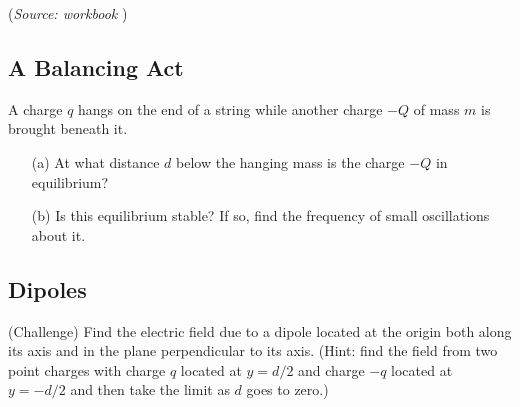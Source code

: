 \documentclass{article}
\begin{document}
(\textit{Source: workbook })

\subsection{A Balancing Act}

A charge $q$ hangs on the end of a string while another charge $-Q$ of mass $m$ is brought beneath it.
\begin{itemize}
	\item[(a)] At what distance $d$ below the hanging mass is the charge $-Q$ in equilibrium?
	\item[(b)] Is this equilibrium stable? If so, find the frequency of small oscillations about it.
\end{itemize}

\subsection{Dipoles}

(Challenge) Find the electric field due to a dipole located at the origin both along its axis and in the plane perpendicular to its axis. (Hint: find the field from two point charges with charge $q$ located at $y=d/2$ and charge $-q$ located at $y=-d/2$ and then take the limit as $d$ goes to zero.)
\end{document}
